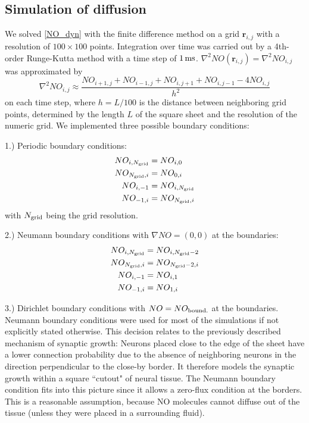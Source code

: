 \documentclass[10pt,letterpaper]{article}
\begin{document}
\subsection*{Simulation of diffusion}
We solved \eqref{NO_dyn} with the finite difference method on a grid $\mathbf{r}_{i,j}$ with a resolution of $100\times 100$ points. Integration over time was carried out by a 4th-order Runge-Kutta method with a time step of $\rm 1\, ms$. $\nabla^2 NO(\mathbf{r}_{i,j}) = \nabla^2 NO_{i,j}$ was approximated by
\begin{equation}
\nabla^2 NO_{i,j} \approx \frac{NO_{i+1,j}+NO_{i-1,j}+NO_{i,j+1}+NO_{i,j-1}-4NO_{i,j}}{h^2}
\label{Laplace_Numeric}
\end{equation}
on each time step, where $h = L/100$ is the distance between neighboring grid points, determined by the length $L$ of the square sheet and the resolution of the numeric grid. We implemented three possible boundary conditions:

1.) Periodic boundary conditions:
\begin{align}
NO_{i,N_{\rm grid}} &= NO_{i,0} \label{Periodic_Cond_1} \\
NO_{N_{\rm grid},i} &= NO_{0,i} \label{Periodic_Cond_2} \\
NO_{i,-1} &= NO_{i,N_{\rm grid}} \label{Periodic_Cond_3} \\
NO_{-1,i} &= NO_{N_{\rm grid},i} \label{Periodic_Cond_4}
\end{align}
with $N_{\rm grid}$ being the grid resolution.

2.) Neumann boundary conditions with $\nabla NO = (0,0)$ at the boundaries:
\begin{align}
NO_{i,N_{\rm grid}} &= NO_{i,N_{\rm grid}-2} \label{Neumann_Cond_1} \\
NO_{N_{\rm grid},i} &= NO_{N_{\rm grid}-2,i} \label{Neumann_Cond_2} \\
NO_{i,-1} &= NO_{i,1} \label{Neumann_Cond_3} \\
NO_{-1,i} &= NO_{1,i} \label{Neumann_Cond_4}
\end{align}

3.) Dirichlet boundary conditions with $NO = NO_{\rm bound.}$ at the boundaries.\\
Neumann boundary conditions were used for most of the simulations if not explicitly stated otherwise. This decision relates to the previously described mechanism of synaptic growth: Neurons placed close to the edge of the sheet have a lower connection probability due to the absence of neighboring neurons in the direction perpendicular to the close-by border. It therefore models the synaptic growth within a square ``cutout" of neural tissue. The Neumann boundary condition fits into this picture since it allows a zero-flux condition at the borders. This is a reasonable assumption, because NO molecules cannot diffuse out of the tissue (unless they were placed in a surrounding fluid).
\end{document}
